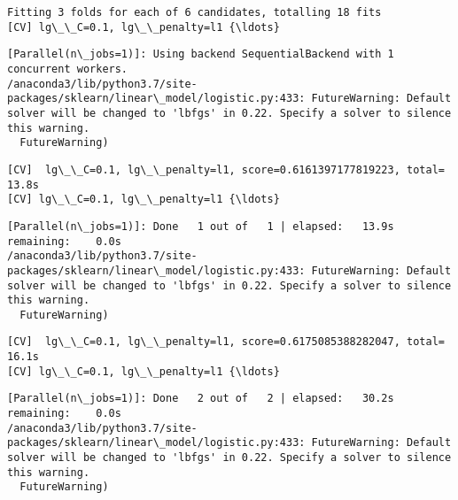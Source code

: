 \documentclass[11pt]{article}
\begin{document}
    \begin{Verbatim}[commandchars=\\\{\}]
Fitting 3 folds for each of 6 candidates, totalling 18 fits
[CV] lg\_\_C=0.1, lg\_\_penalty=l1 {\ldots}

    \end{Verbatim}

    \begin{Verbatim}[commandchars=\\\{\}]
[Parallel(n\_jobs=1)]: Using backend SequentialBackend with 1 concurrent workers.
/anaconda3/lib/python3.7/site-packages/sklearn/linear\_model/logistic.py:433: FutureWarning: Default solver will be changed to 'lbfgs' in 0.22. Specify a solver to silence this warning.
  FutureWarning)

    \end{Verbatim}

    \begin{Verbatim}[commandchars=\\\{\}]
[CV]  lg\_\_C=0.1, lg\_\_penalty=l1, score=0.6161397177819223, total=  13.8s
[CV] lg\_\_C=0.1, lg\_\_penalty=l1 {\ldots}

    \end{Verbatim}

    \begin{Verbatim}[commandchars=\\\{\}]
[Parallel(n\_jobs=1)]: Done   1 out of   1 | elapsed:   13.9s remaining:    0.0s
/anaconda3/lib/python3.7/site-packages/sklearn/linear\_model/logistic.py:433: FutureWarning: Default solver will be changed to 'lbfgs' in 0.22. Specify a solver to silence this warning.
  FutureWarning)

    \end{Verbatim}

    \begin{Verbatim}[commandchars=\\\{\}]
[CV]  lg\_\_C=0.1, lg\_\_penalty=l1, score=0.6175085388282047, total=  16.1s
[CV] lg\_\_C=0.1, lg\_\_penalty=l1 {\ldots}

    \end{Verbatim}

    \begin{Verbatim}[commandchars=\\\{\}]
[Parallel(n\_jobs=1)]: Done   2 out of   2 | elapsed:   30.2s remaining:    0.0s
/anaconda3/lib/python3.7/site-packages/sklearn/linear\_model/logistic.py:433: FutureWarning: Default solver will be changed to 'lbfgs' in 0.22. Specify a solver to silence this warning.
  FutureWarning)

    \end{Verbatim}
\end{document}
